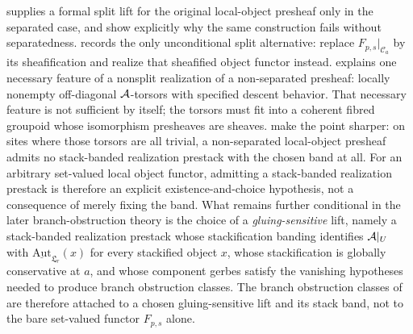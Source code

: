 \begin{remark}\label{rem:gluing-sensitive-lifts}
 supplies a formal split lift for the original local-object presheaf only in the separated case, and  show explicitly why the same construction fails without separatedness.  records the only unconditional split alternative: replace $F_{p,s}|_{\mathcal C_a}$ by its sheafification and realize that sheafified object functor instead.  explains one necessary feature of a nonsplit realization of a non-separated presheaf: locally nonempty off-diagonal $\mathcal{A}$-torsors with specified descent behavior. That necessary feature is not sufficient by itself; the torsors must fit into a coherent fibred groupoid whose isomorphism presheaves are sheaves.  make the point sharper: on sites where those torsors are all trivial, a non-separated local-object presheaf admits no stack-banded realization prestack with the chosen band at all. For an arbitrary set-valued local object functor, admitting a stack-banded realization prestack is therefore an explicit existence-and-choice hypothesis, not a consequence of merely fixing the band. What remains further conditional in the later branch-obstruction theory is the choice of a \emph{gluing-sensitive} lift, namely a stack-banded realization prestack whose stackification banding identifies $\mathcal{A}|_U$ with $\underline{\mathrm{Aut}}_{\mathfrak L_r}(x)$ for every stackified object $x$, whose stackification is globally conservative at $a$, and whose component gerbes satisfy the vanishing hypotheses needed to produce branch obstruction classes. The branch obstruction classes of  are therefore attached to a chosen gluing-sensitive lift and its stack band, not to the bare set-valued functor $F_{p,s}$ alone.
\end{remark}
